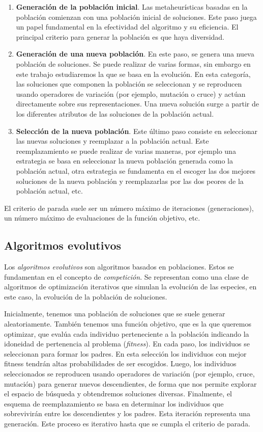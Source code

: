 \begin{enumerate}
    \item \textbf{Generación de la población inicial}. Las metaheurísticas basadas en la población comienzan con una población inicial de soluciones. Este paso juega un papel fundamental en la efectividad del algoritmo y su eficiencia. El principal criterio para generar la población es que haya diversidad.
    \item \textbf{Generación de una nueva población}. En este paso, se genera una nueva población de soluciones. Se puede realizar de varias formas, sin embargo en este trabajo estudiaremos la que se basa en la evolución. En esta categoría, las soluciones que componen la población se seleccionan y se reproducen usando operadores de variación (por ejemplo, mutación o cruce) y actúan directamente sobre sus representaciones. Una nueva solución surge a partir de los diferentes atributos de las soluciones de la población actual.
    \item \textbf{Selección de la nueva población}. Este último paso consiste en seleccionar las nuevas soluciones y reemplazar a la población actual. Este reemplazamiento se puede realizar de varias maneras, por ejemplo una estrategia se basa en seleccionar la nueva población generada como la población actual, otra estrategia se fundamenta en el escoger las dos mejores soluciones de la nueva población y reemplazarlas por las dos peores de la población actual, etc.
\end{enumerate}

El criterio de parada suele ser un número máximo de iteraciones (generaciones), un número máximo de evaluaciones de la función objetivo, etc.

\subsection{Algoritmos evolutivos}

Los \emph{algoritmos evolutivos} son algoritmos basados en poblaciones. Estos se fundamentan en el concepto de \emph{competición}. Se representan como una clase de algoritmos de optimización iterativos que simulan la evolución de las especies, en este caso, la evolución de la población de soluciones.

Inicialmente, tenemos una población de soluciones que se suele generar aleatoriamente. También tenemos una función objetivo, que es la que queremos optimizar, que evalúa cada individuo perteneciente a la población indicando la idoneidad de pertenencia al problema (\emph{fitness}). En cada paso, los individuos se seleccionan para formar los padres. En esta selección los individuos con mejor fitness tendrán altas probabilidades de ser escogidos. Luego, los individuos seleccionados se reproducen usando operadores de variación (por ejemplo, cruce, mutación) para generar nuevos descendientes, de forma que nos permite explorar el espacio de búsqueda y obtendremos soluciones diversas. Finalmente, el esquema de reemplazamiento se basa en determinar los individuos que sobrevivirán entre los descendientes y los padres. Esta iteración representa una generación. Este proceso es iterativo hasta que se cumpla el criterio de parada.

